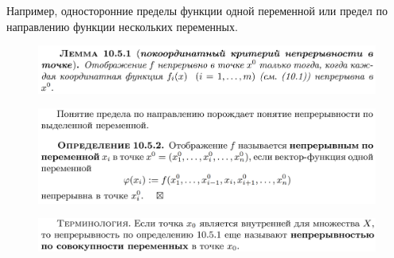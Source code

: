 \documentclass{article}
\begin{document}
\begin{figure}[h!]
    \centering
\end{figure}
Например, односторонние пределы функции одной переменной или предел по направлению функции нескольких переменных.
\newpage
\begin{figure}[h!]
    \centering
    \vspace{-1cm}
\end{figure}
\begin{figure}[h!]
    \centering
    \includegraphics[width=\textwidth]{23.png}
    \vspace{-1cm}
\end{figure}
\begin{figure}[h!]
    \centering
    \includegraphics[width=\textwidth]{24.png}
    \vspace{-1cm}
\end{figure}
\begin{figure}[h!]
    \centering
    \includegraphics[width=\textwidth]{25.png}
    \vspace{-1cm}
\end{figure}
\end{document}
